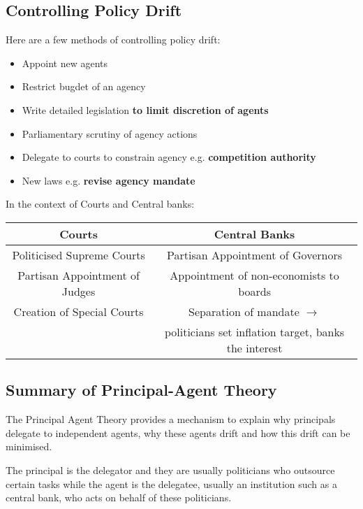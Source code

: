 \documentclass[12pt, letterpaper]{article}
\begin{document}
\subsection{Controlling Policy Drift}
Here are a few methods of controlling policy drift:
\begin{itemize}
	\item Appoint new agents
	\item Restrict bugdet of an agency
	\item Write detailed legislation \textbf{to limit discretion of agents}
	\item Parliamentary scrutiny of agency actions
	\item Delegate to courts to constrain agency e.g. \textbf{competition authority}
	\item New laws e.g. \textbf{revise agency mandate}
\end{itemize}
In the context of Courts and Central banks:
\begin{center}
\begin{adjustbox}{width=.85\textwidth}
\begin{tabular}{c|c}

Courts & Central Banks\\
\hline
Politicised Supreme Courts & Partisan Appointment of Governors\\
Partisan Appointment of Judges & Appointment of non-economists to boards\\
Creation of Special Courts & Separation of mandate $\rightarrow$\\ 
& politicians set inflation target, banks the interest\\
\hline

\end{tabular}
\end{adjustbox}
\end{center}

\subsection{Summary of Principal-Agent Theory}
The Principal Agent Theory provides a mechanism to explain why principals delegate to independent agents, why these agents drift and how this drift can be minimised.

The principal is the delegator and they are usually politicians who outsource certain tasks while the agent is the delegatee, usually an institution such as a central bank, who acts on behalf of these politicians.
\end{document}
